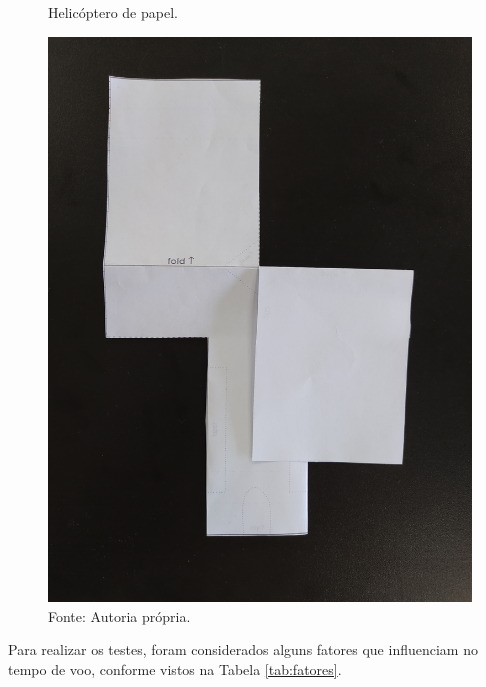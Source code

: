 

\begin{figure}[H]
  \caption{Helicóptero de papel.}
  \centering
  \includegraphics[width=1\textwidth]{images/IMG_20200918_162251.jpg}
  \caption*{Fonte: Autoria própria.}
  \label{fig:heli_papel}
\end{figure}

Para realizar os testes, foram considerados alguns fatores que influenciam no tempo de voo, conforme vistos na Tabela \ref{tab:fatores}.

